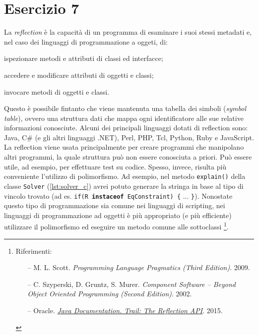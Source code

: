 \section*{Esercizio 7}

La \emph{reflection} è la capacità di un programma di esaminare i suoi stessi
metadati e, nel caso dei linguaggi di programmazione a oggeti, di: %
%
\begin{enumerate*}
    \item ispezionare metodi e attributi di classi ed interfacce;
    \item accedere e modificare attributi di oggetti e classi;
    \item invocare metodi di oggetti e classi.
\end{enumerate*}
%
Questo è possibile fintanto che viene mantenuta una tabella dei simboli
(\emph{symbol table}), ovvero una struttura dati che mappa ogni identificatore
alle sue relative informazioni conosciute. Alcuni dei principali linguaggi
dotati di reflection sono: Java, C\# (e gli altri linguaggi .NET), Perl, PHP,
Tcl, Python, Ruby e JavaScript. La reflection viene usata principalmente per
creare programmi che manipolano altri programmi, la quale struttura può non
essere conosciuta a priori. Può essere utile, ad esempio, per effettuare test su
codice. Spesso, invece, risulta più conveniente l'utilizzo di polimorfismo. Ad
esempio, nel metodo {\tt explain()} della classe {\tt Solver}
(\autoref{lst:solver_c}) avrei potuto generare la stringa in base al tipo di
vincolo trovato (ad es. \texttt{if(R \textbf{instaceof} EqConstraint) \{} ...
{\tt \}}). Nonostate questo tipo di programmazione sia comune nei linguaggi di
scripting, nei linguaggi di programmazione ad oggetti è più appropriato (e più
efficiente) utilizzare il polimorfismo ed eseguire un metodo comune alle
sottoclassi
%
\footnote{Riferimenti:%
\begin{itemize}[noitemsep,topsep=0pt]
    \item[--] M. L. Scott. \emph{Programming Language Pragmatics (Third
    Edition)}. 2009.
    \item[--] C. Szyperski, D. Gruntz, S. Murer. \emph{Component Software --
    Beyond Object Oriented Programming (Second Edition)}. 2002.
    \item[--] Oracle.
    \href{http://docs.oracle.com/javase/tutorial/reflect/index.html}{
    \emph{Java\texttrademark{} Documentation. Trail: The Reflection API}}. 2015.
\end{itemize}}.
